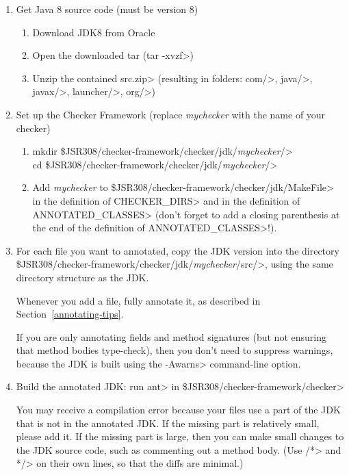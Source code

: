 \begin{enumerate}
\item
Get Java 8 source code (must be version 8)
\begin{enumerate}
\item Download JDK8 from Oracle
\item Open the downloaded tar (\<tar -xvzf>)
\item Unzip the contained \<src.zip> (resulting in folders: \<com/>, \<java/>, \<javax/>, \<launcher/>, \<org/>)
\end{enumerate}

\item
Set up the Checker Framework (replace \textit{mychecker} with the name of your checker)
\begin{enumerate}
\item \<mkdir \$JSR308/checker-framework/checker/jdk/\textit{mychecker}/> \\
  \<cd \$JSR308/checker-framework/checker/jdk/\textit{mychecker}/> \\

\item Add \textit{mychecker} to
  \<\$JSR308/checker-framework/checker/jdk/MakeFile> in the  definition of
  \<CHECKER\_DIRS> and in the definition of \<ANNOTATED\_CLASSES> (don't forget
  to add a closing parenthesis at the end of the definition of \<ANNOTATED\_CLASSES>!).

\end{enumerate}

\item
For each file you want to annotated, copy the JDK version into the
directory
\<\$JSR308/checker-framework/checker/jdk/\textit{mychecker}/src/>, using
the same directory structure as the JDK\@.

Whenever you add a file, fully annotate it, as described in
Section~\ref{annotating-tips}.

If you are only annotating fields and method signatures (but not
ensuring that method bodies type-check), then you don't need to suppress
warnings, because the JDK is built using the \<-Awarns> command-line
option.

\item
Build the annotated JDK:
	run \<ant> in \<\$JSR308/checker-framework/checker>

You may receive a compilation error because your files use a part of the
JDK that is not in the annotated JDK\@.  If the missing part is relatively
small, please add it.  If the missing part is large, then you can make
small changes to the JDK source code, such as commenting out a method body.
(Use \</*> and \<*/> on their own lines, so that the diffs are minimal.)

\end{enumerate}


